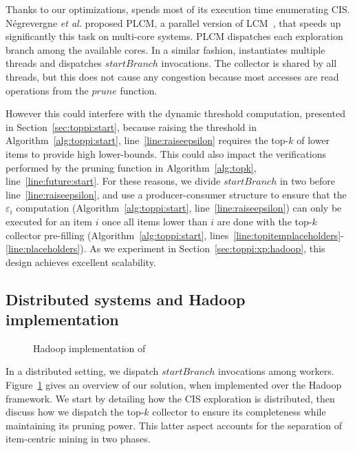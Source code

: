 Thanks to our optimizations,
\toppi spends most of its execution time enumerating CIS.
Négrevergne {\em et al.} proposed PLCM, a parallel version of LCM~\cite{NegrevergneHPCS10},
that speeds up significantly this task on multi-core systems.
PLCM dispatches each exploration branch among the available cores.
In a similar fashion,
\toppi instantiates multiple threads and dispatches $\mathit{startBranch}$ invocations.
The collector is shared by all threads, but this does not cause any congestion
because most accesses are read operations from the $\mathit{prune}$ function.

However this could interfere with the dynamic threshold computation, presented in Section~\ref{sec:toppi:start},
because raising the threshold in Algorithm~\ref{alg:toppi:start}, line~\ref{line:raiseepsilon}
requires the top-$k$ of lower items to provide high lower-bounds.
This could also impact the verifications performed by the pruning function
in Algorithm~\ref{alg:topk}, line~\ref{line:future:start}.
For these reasons, we divide  $\mathit{startBranch}$ in two before line~\ref{line:raiseepsilon},
and use a producer-consumer structure to ensure that
the $\varepsilon_i$ computation (Algorithm~\ref{alg:toppi:start}, line~\ref{line:raiseepsilon})
can only be executed for an item $i$ once all items lower than $i$ are done with the top-$k$ collector pre-filling
(Algorithm~\ref{alg:toppi:start}, lines~\ref{line:topitemplaceholders}-\ref{line:placeholders}).
As we experiment in Section~\ref{sec:toppi:xp:hadoop}, this design achieves excellent scalability.




\subsection{Distributed systems and Hadoop implementation}
\label{sec:toppi:distributed}

\begin{figure}[tb]
	\centering
	\begin{scriptsize}
	\def\svgwidth{\linewidth}
	
	\end{scriptsize}
	\caption{\label{fig:toppihadoop}Hadoop implementation of \toppi}
\end{figure}

In a distributed setting, we dispatch $\mathit{startBranch}$ invocations among workers.
Figure~\ref{fig:toppihadoop} gives an overview of our solution,
when implemented over the Hadoop framework.
We start by detailing how the CIS exploration is distributed,
then discuss how we dispatch the top-$k$ collector
to ensure its completeness while maintaining its pruning power.
This latter aspect accounts for the separation of item-centric mining in two phases.

